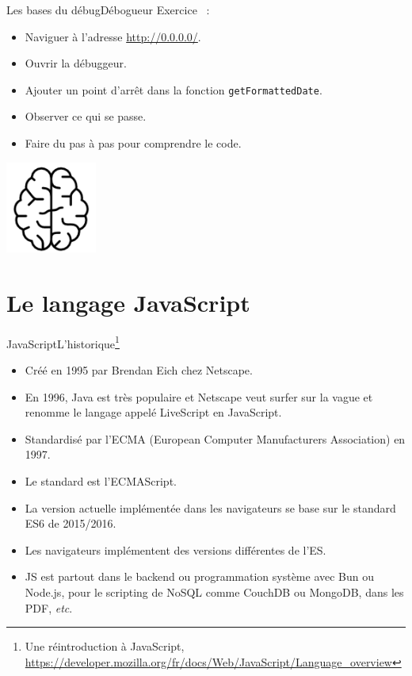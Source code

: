 \documentclass{beamer}
\begin{document}
    \begin{frame}{Les bases du débug}{Débogueur}
        Exercice \execcounterdispinc{}~:
        \begin{itemize}
            \item Naviguer à l'adresse \url{http://0.0.0.0/}.
            \item Ouvrir la débuggeur.
            \item Ajouter un point d'arrêt dans la fonction \lstinline{getFormattedDate}.
            \item Observer ce qui se passe.
            \item Faire du pas à pas pour comprendre le code.
        \end{itemize}
        \bigbreak
        \centering
        \includegraphics[width=3cm]{image/intelligence}
    \end{frame}


    \section{Le langage JavaScript}\label{sec:js-lang}
    \begin{frame}{JavaScript}{L'historique\footnote{\label{mozilla-js}Une réintroduction à JavaScript, \url{https://developer.mozilla.org/fr/docs/Web/JavaScript/Language_overview}}}
        \begin{itemize}
            \item Créé en 1995 par Brendan Eich chez Netscape.
            \item En 1996, Java est très populaire et Netscape veut surfer sur la vague et renomme le langage appelé LiveScript en JavaScript.
            \item Standardisé par l'ECMA (European Computer Manufacturers Association) en 1997.
            \item Le standard est l'ECMAScript.
            \item La version actuelle implémentée dans les navigateurs se base sur le standard ES6 de 2015/2016.
            \item Les navigateurs implémentent des versions différentes de l'ES.
            \item JS est partout dans le backend ou programmation système avec Bun ou Node.js, pour le scripting de NoSQL comme CouchDB ou MongoDB, dans les PDF, \textit{etc}.
        \end{itemize}
    \end{frame}
\end{document}
